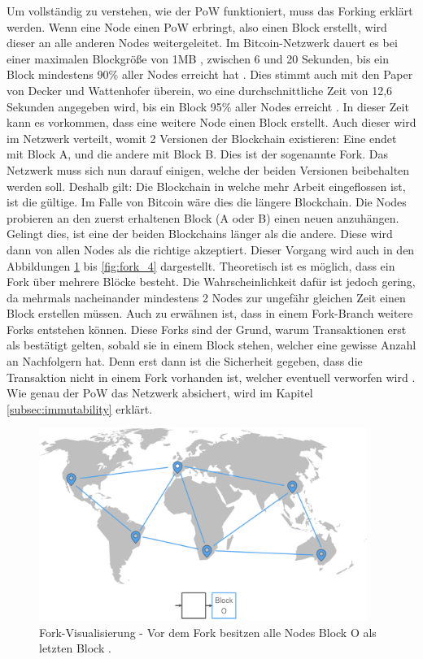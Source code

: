 Um vollständig zu verstehen, wie der PoW funktioniert, muss das Forking erklärt werden. Wenn eine Node einen PoW erbringt, also einen Block erstellt, wird dieser an alle anderen Nodes weitergeleitet. Im Bitcoin-Netzwerk dauert es bei einer maximalen Blockgröße von 1MB \cite{AntonopoulosMasteringbitcoin2015}, zwischen 6 und 20 Sekunden, bis ein Block mindestens 90\% aller Nodes erreicht hat \cite{BitcoinStatsBitcoinPropagationData}. Dies stimmt auch mit den Paper von Decker und Wattenhofer überein, wo eine durchschnittliche Zeit von 12,6 Sekunden angegeben wird, bis ein Block 95\% aller Nodes erreicht \cite{DeckerInformationpropagationbitcoin2013}. In dieser Zeit kann es vorkommen, dass eine weitere Node einen Block erstellt. Auch dieser wird im Netzwerk verteilt, womit 2 Versionen der Blockchain existieren: Eine endet mit Block A, und die andere mit Block B. Dies ist der sogenannte Fork. Das Netzwerk muss sich nun darauf einigen, welche der beiden Versionen beibehalten werden soll. Deshalb gilt: Die Blockchain in welche mehr Arbeit eingeflossen ist, ist die gültige. Im Falle von Bitcoin wäre dies die längere Blockchain. Die Nodes probieren an den zuerst erhaltenen Block (A oder B) einen neuen anzuhängen. Gelingt dies, ist eine der beiden Blockchains länger als die andere. Diese wird dann von allen Nodes als die richtige akzeptiert. Dieser Vorgang wird auch in den Abbildungen \ref{fig:fork_1} bis \ref{fig:fork_4} dargestellt. Theoretisch ist es möglich, dass ein Fork über mehrere Blöcke besteht. Die Wahrscheinlichkeit dafür ist jedoch gering, da mehrmals nacheinander mindestens 2 Nodes zur ungefähr gleichen Zeit einen Block erstellen müssen. Auch zu erwähnen ist, dass in einem Fork-Branch weitere Forks entstehen können. Diese Forks sind der Grund, warum Transaktionen erst als bestätigt gelten, sobald sie in einem Block stehen, welcher eine gewisse Anzahl an Nachfolgern hat. Denn erst dann ist die Sicherheit gegeben, dass die Transaktion nicht in einem Fork vorhanden ist, welcher eventuell verworfen wird \cite{AntonopoulosMasteringbitcoin2015}. Wie genau der PoW das Netzwerk absichert, wird im Kapitel \ref{subsec:immutability} erklärt.


\begin{figure}[htb]
  \centering
    \includegraphics[width=0.95\textwidth,angle=0]{images/fork_1}
 	\caption{Fork-Visualisierung - Vor dem Fork besitzen alle Nodes Block O als letzten Block \cite{AntonopoulosMasteringbitcoin2015}.}
	\label{fig:fork_1}
\end{figure}

